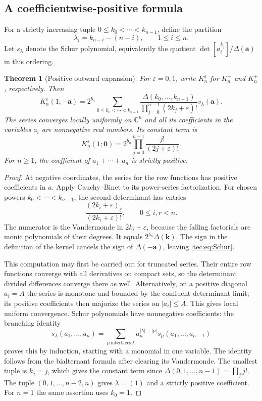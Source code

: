 \documentclass[11pt,a4paper]{article}
\numberwithin{equation}{section}
\newtheorem{theorem}{Theorem}[section]
\theoremstyle{definition}
\theoremstyle{remark}
\newcommand{\CC}{\mathbb C}
\newcommand{\Del}{\Delta}
\newcommand{\ba}{\boldsymbol a}
\newcommand{\fall}[2]{(#1)_{\underline{#2}}}
\begin{document}
\subsection{A coefficientwise-positive formula}
For a strictly increasing tuple $0\le k_0<\cdots<k_{n-1}$, define the
partition
\begin{equation}\label{tec:eq:partition}
 \lambda_i=k_{n-i}-(n-i),\qquad 1\le i\le n.
\end{equation}
Let $s_\lambda$ denote the Schur polynomial, equivalently the quotient
$\det[a_i^{k_j}]/\Del(\ba)$ in this ordering.
\begin{theorem}[Positive outward expansion]\label{tec:thm:Schur}
For $\varepsilon=0,1$, write $K_n^\varepsilon$ for $K_n^-$ and $K_n^+$,
respectively. Then
\begin{equation}\label{tec:eq:Schur}
 K_n^\varepsilon(1;-\ba)=2^{b_n}
 \sum_{0\le k_0<\cdots<k_{n-1}}
 \frac{\Del(k_0,\ldots,k_{n-1})}
      {\prod_{j=0}^{n-1}(2k_j+\varepsilon)!}
 s_\lambda(\ba).
\end{equation}
The series converges locally uniformly on $\CC^n$ and all its coefficients
in the variables $a_i$ are nonnegative real numbers. Its constant term is
\begin{equation}\label{tec:eq:Kzero}
 K_n^\varepsilon(1;\boldsymbol0)
 =2^{b_n}\prod_{j=0}^{n-1}\frac{j!}{(2j+\varepsilon)!}.
\end{equation}
For $n\ge1$, the coefficient of $a_1+\cdots+a_n$ is strictly positive.
\end{theorem}
\begin{proof}
At negative coordinates, the series for the row functions has positive
coefficients in $a$. Apply Cauchy--Binet to its power-series factorization.
For chosen powers $k_0<\cdots<k_{n-1}$, the second determinant has entries
\[
 \frac{\fall{2k_i+\varepsilon}{r}}{(2k_i+\varepsilon)!},
 \qquad 0\le i,r<n.
\]
The numerator is the Vandermonde in $2k_i+\varepsilon$, because the
falling factorials are monic polynomials of their degrees. It equals
$2^{b_n}\Del(\boldsymbol k)$. The sign in the definition of the kernel
cancels the sign of $\Del(-\ba)$, leaving \eqref{tec:eq:Schur}.

This computation may first be carried out for truncated series. Their
entire row functions converge with all derivatives on compact sets, so
the determinant divided differences converge there as well. Alternatively,
on a positive diagonal $a_i=A$ the series is monotone and bounded by the
confluent determinant limit; its positive coefficients then majorize the
series on $|a_i|\le A$. This gives local uniform convergence.
Schur polynomials have nonnegative coefficients: the branching identity
\[
 s_\lambda(a_1,\ldots,a_n)
 =\sum_{\mu\,\text{interlaces}\,\lambda}
     a_n^{|\lambda|-|\mu|}s_\mu(a_1,\ldots,a_{n-1})
\]
proves this by induction, starting with a monomial in one variable.
The identity follows from the bialternant formula after clearing its
Vandermonde. The smallest tuple is $k_j=j$, which gives the constant
term since $\Del(0,1,\ldots,n-1)=\prod_jj!$.
The tuple $(0,1,\ldots,n-2,n)$ gives $\lambda=(1)$ and a strictly
positive coefficient. For $n=1$ the same assertion uses $k_0=1$.
\end{proof}
\end{document}

